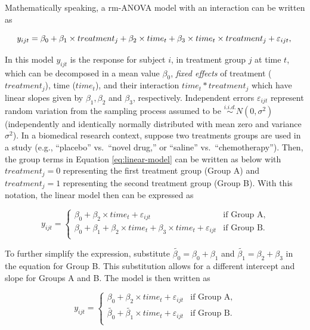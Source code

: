 \documentclass[
]{article}
\begin{document}
Mathematically speaking, a rm-ANOVA model with an interaction can be written as

\begin{equation}
y_{ijt} = \beta_0+\beta_1 \times treatment_{j} +\beta_2 \times time_{t} +\beta_3 \times time_{t}\times treatment_{j}+\varepsilon_{ijt},\\ 
\label{eq:linear-model}
\end{equation}

In this model \(y_{ijt}\) is the response for subject \(i\), in treatment group \(j\) at time \(t\), which can be decomposed in a mean value \(\beta_0\), \emph{fixed effects} of treatment (\(treatment_j\)), time (\(time_t\)), and their interaction \(time_t*treatment_j\) which have linear slopes given by \(\beta_1, \beta_2\) and \(\beta_3\), respectively. Independent errors \(\varepsilon_{ijt}\) represent random variation from the sampling process assumed to be \(\stackrel{i.i.d.}\sim N(0,\sigma^2)\) (independently and identically normally distributed with mean zero and variance \(\sigma^2\)).
In a biomedical research context, suppose two treatments groups are used in a study (e.g., ``placebo'' vs.~``novel drug,'' or ``saline'' vs.~``chemotherapy''). Then, the group terms in Equation \eqref{eq:linear-model} can be written as below with \(treatment_j=0\) representing the first treatment group (Group A) and \(treatment_j=1\) representing the second treatment group (Group B). With this notation, the linear model then can be expressed as

\begin{equation}
y_{ijt} = \begin{cases}
\beta_0 + \beta_2\times time_{t}+\varepsilon_{ijt}   & \mbox{if Group A},\\
\beta_0 + \beta_1+\beta_2 \times time_{t} +\beta_3 \times time_{t}+\varepsilon_{ijt}  & \mbox{if Group B}.\\
\end{cases}
\label{eq:ANOVA-by-group}
\end{equation}

To further simplify the expression, substitute \(\widetilde{\beta_{0}}=\beta_0+\beta_{1}\) and \(\widetilde{\beta_{1}}=\beta_{2}+\beta_{3}\) in the equation for Group B. This substitution allows for a different intercept and slope for Groups A and B. The model is then written as

\begin{equation}
y_{ijt} = \begin{cases}
\beta_0 + \beta_2\times time_{t}+\varepsilon_{ijt}   & \mbox{if Group A},\\
\widetilde{\beta_{0}} + \widetilde{\beta_1} \times time_{t}+\varepsilon_{ijt}  & \mbox{if Group B}.\\
\end{cases}
\label{eq:ANOVA-lines}
\end{equation}
\end{document}
